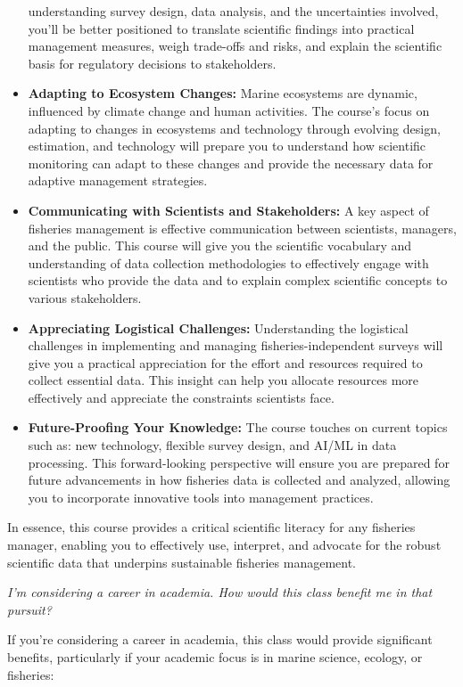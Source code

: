 \documentclass[
  letterpaper,
  oneside,
  open=any]{scrbook}
\begin{document}
\begin{itemize}
  understanding survey design, data analysis, and the uncertainties
  involved, you'll be better positioned to translate scientific findings
  into practical management measures, weigh trade-offs and risks, and
  explain the scientific basis for regulatory decisions to stakeholders.
\item
  \textbf{Adapting to Ecosystem Changes:} Marine ecosystems are dynamic,
  influenced by climate change and human activities. The course's focus
  on adapting to changes in ecosystems and technology through evolving
  design, estimation, and technology will prepare you to understand how
  scientific monitoring can adapt to these changes and provide the
  necessary data for adaptive management strategies.
\item
  \textbf{Communicating with Scientists and Stakeholders:} A key aspect
  of fisheries management is effective communication between scientists,
  managers, and the public. This course will give you the scientific
  vocabulary and understanding of data collection methodologies to
  effectively engage with scientists who provide the data and to explain
  complex scientific concepts to various stakeholders.
\item
  \textbf{Appreciating Logistical Challenges:} Understanding the
  logistical challenges in implementing and managing
  fisheries-independent surveys will give you a practical appreciation
  for the effort and resources required to collect essential data. This
  insight can help you allocate resources more effectively and
  appreciate the constraints scientists face.
\item
  \textbf{Future-Proofing Your Knowledge:} The course touches on current
  topics such as: new technology, flexible survey design, and AI/ML in
  data processing. This forward-looking perspective will ensure you are
  prepared for future advancements in how fisheries data is collected
  and analyzed, allowing you to incorporate innovative tools into
  management practices.
\end{itemize}

In essence, this course provides a critical scientific literacy for any
fisheries manager, enabling you to effectively use, interpret, and
advocate for the robust scientific data that underpins sustainable
fisheries management.

\emph{I'm considering a career in academia. How would this class benefit
me in that pursuit?}

If you're considering a career in academia, this class would provide
significant benefits, particularly if your academic focus is in marine
science, ecology, or fisheries:
\end{document}
